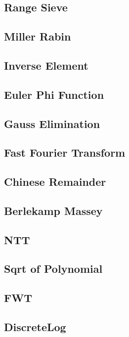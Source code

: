 \documentclass[a4paper,10pt,twocolumn,oneside]{article}
\begin{document}
\subsection{Range Sieve}

\subsection{Miller Rabin}

\subsection{Inverse Element}

\subsection{Euler Phi Function}

\subsection{Gauss Elimination}

\subsection{Fast Fourier Transform}

\subsection{Chinese Remainder}

\subsection{Berlekamp Massey}

\subsection{NTT}

\subsection{Sqrt of Polynomial}

\subsection{FWT}

\subsection{DiscreteLog}

\end{document}
